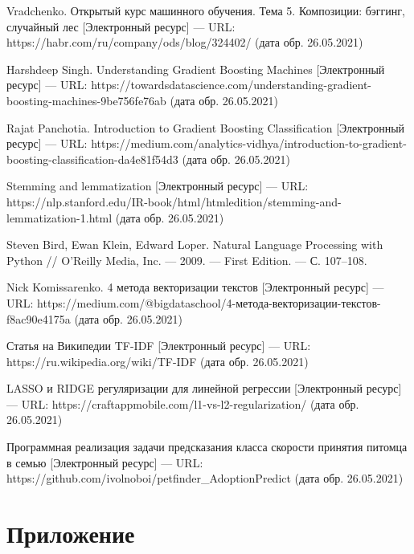 \documentclass[14pt]{mmcs_article}
\begin{document}
\begin{thebibliography}{0}
Vradchenko. Открытый курс машинного обучения. Тема 5. Композиции: бэггинг, случайный лес [Электронный ресурс] --- URL: https://habr.com/ru/company/ods/blog/324402/ (дата обр. 26.05.2021)

Harshdeep Singh. Understanding Gradient Boosting Machines [Электронный ресурс] --- URL: https://towardsdatascience.com/understanding-gradient-boosting-machines-9be756fe76ab (дата обр. 26.05.2021)

Rajat Panchotia. Introduction to Gradient Boosting Classification [Электронный ресурс] --- URL: https://medium.com/analytics-vidhya/introduction-to-gradient-boosting-classification-da4e81f54d3 (дата обр. 26.05.2021)

Stemming and lemmatization [Электронный ресурс] --- URL: https://nlp.stanford.edu/IR-book/html/htmledition/stemming-and-lemmatization-1.html (дата обр. 26.05.2021)

Steven Bird, Ewan Klein, Edward Loper. Natural Language Processing with Python // O’Reilly Media, Inc. — 2009. --- First Edition. --- С. 107–108.

Nick Komissarenko. 4 метода векторизации текстов [Электронный ресурс] --- URL: https://medium.com/@bigdataschool/4-метода-векторизации-текстов-f8ac90e4175a (дата обр. 26.05.2021)

Статья на Википедии TF-IDF [Электронный ресурс] --- URL: https://ru.wikipedia.org/wiki/TF-IDF (дата обр. 26.05.2021)

LASSO и RIDGE регуляризации для линейной регрессии [Электронный ресурс] --- URL: https://craftappmobile.com/l1-vs-l2-regularization/ (дата обр. 26.05.2021)

Программная реализация задачи предсказания класса скорости принятия питомца в семью [Электронный ресурс] --- URL: https://github.com/ivolnoboi/petfinder\_AdoptionPredict (дата обр. 26.05.2021)


\end{thebibliography}



\newpage

\section*{Приложение}
\end{document}
